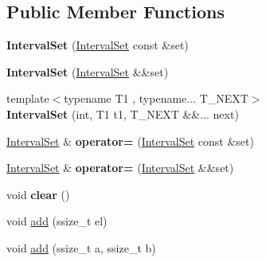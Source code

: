 \subsection*{Public Member Functions}
\begin{DoxyCompactItemize}
\item 
\mbox{\label{classantlr4_1_1misc_1_1IntervalSet_ab321bbad8af15b8ad4b37c1562b675a6}} 
{\bfseries Interval\+Set} (\hyperlink{classantlr4_1_1misc_1_1IntervalSet}{Interval\+Set} const \&set)
\item 
\mbox{\label{classantlr4_1_1misc_1_1IntervalSet_acf4301930f887a53963f7914c0eead97}} 
{\bfseries Interval\+Set} (\hyperlink{classantlr4_1_1misc_1_1IntervalSet}{Interval\+Set} \&\&set)
\item 
\mbox{\label{classantlr4_1_1misc_1_1IntervalSet_a9f1b9139afcfd82ff46c586ed4fd96d5}} 
{\footnotesize template$<$typename T1 , typename... T\+\_\+\+N\+E\+XT$>$ }\\{\bfseries Interval\+Set} (int, T1 t1, T\+\_\+\+N\+E\+XT \&\&... next)
\item 
\mbox{\label{classantlr4_1_1misc_1_1IntervalSet_abdafeb29f314fadf9832c61d33a55662}} 
\hyperlink{classantlr4_1_1misc_1_1IntervalSet}{Interval\+Set} \& {\bfseries operator=} (\hyperlink{classantlr4_1_1misc_1_1IntervalSet}{Interval\+Set} const \&set)
\item 
\mbox{\label{classantlr4_1_1misc_1_1IntervalSet_ab98983e9c22da6cdb3ab47e95d76550f}} 
\hyperlink{classantlr4_1_1misc_1_1IntervalSet}{Interval\+Set} \& {\bfseries operator=} (\hyperlink{classantlr4_1_1misc_1_1IntervalSet}{Interval\+Set} \&\&set)
\item 
\mbox{\label{classantlr4_1_1misc_1_1IntervalSet_a09d89c38e3bde61406db9b8165f8ce58}} 
void {\bfseries clear} ()
\item 
void \hyperlink{classantlr4_1_1misc_1_1IntervalSet_ad8e72d626d99ce3cc0b7f4d0a973aec4}{add} (ssize\+\_\+t el)
\item 
void \hyperlink{classantlr4_1_1misc_1_1IntervalSet_a4b86051dddc4528980ae54202c58c2ef}{add} (ssize\+\_\+t a, ssize\+\_\+t b)

\end{DoxyCompactItemize}
